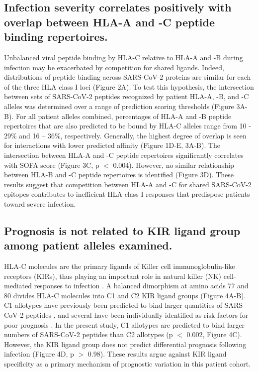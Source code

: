 \documentclass[utf8]{frontiersinFPHY_FAMS} %
\begin{document}
\subsection*{Infection severity correlates positively with overlap between HLA-A and -C peptide binding repertoires.} Unbalanced viral peptide binding by HLA-C relative to HLA-A and -B during infection may be exacerbated by competition for shared ligands. Indeed, distributions of peptide binding across SARS-CoV-2 proteins are similar for each of the three HLA class I loci (Figure 2A). To test this hypothesis, the intersection between sets of SARS-CoV-2 peptides recognized by patient HLA-A, -B, and -C alleles was determined over a range of prediction scoring thresholds (Figure 3A-B). For all patient alleles combined, percentages of HLA-A and -B peptide repertoires that are also predicted to be bound by HLA-C alleles range from 10 - 29\% and 16 – 36\%, respectively. Generally, the highest degree of overlap is seen for interactions with lower predicted affinity (Figure 1D-E, 3A-B). The intersection between HLA-A and -C peptide repertoires significantly correlates with SOFA score (Figure 3C, p $<$ 0.004). However, no similar relationship between HLA-B and -C peptide repertoires is identified (Figure 3D). These results suggest that competition between HLA-A and -C for shared SARS-CoV-2 epitopes contributes to inefficient HLA class I responses that predispose patients toward severe infection. 

\subsection*{Prognosis is not related to KIR ligand group among patient alleles examined.} HLA-C molecules are the primary ligands of Killer cell immunoglobulin-like receptors (KIRs), thus playing an important role in natural killer (NK) cell-mediated responses to infection \citep{11861603, 18650461}. A balanced dimorphism at amino acids 77 and 80 divides HLA-C molecules into C1 and C2 KIR ligand groups \citep{8265660} (Figure 4A-B).  C1 allotypes have previously been predicted to bind larger quantities of SARS-CoV-2 peptides \citep{32810602}, and several have been individually identified as risk factors for poor prognosis \citep{32988645, 32717807, 32717807, 35960731, 34490415, 33343579, 34289534, 34722002, 33298875, 32988645}. In the present study, C1 allotypes are predicted to bind larger numbers of SARS-CoV-2 peptides than C2 allotypes (p $<$ 0.002, Figure 4C). However, the KIR ligand group does not predict differential prognosis following infection (Figure 4D, p $>$ 0.98). These results argue against KIR ligand specificity as a primary mechanism of prognostic variation in this patient cohort.
\end{document}
